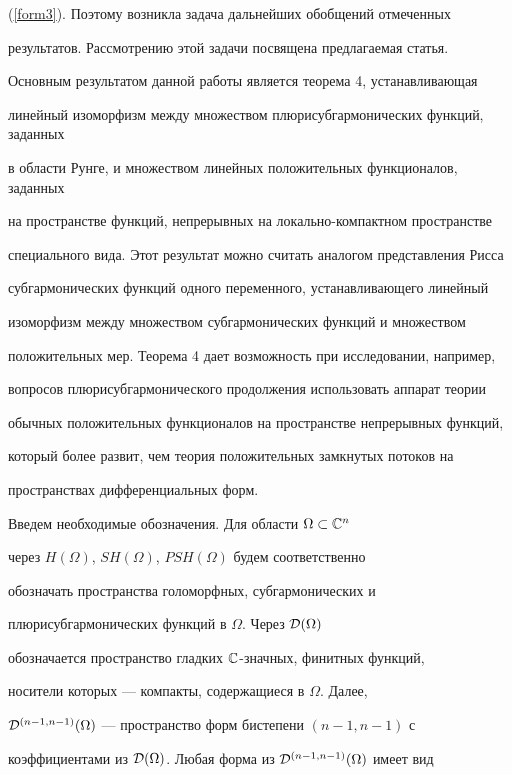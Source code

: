 (\ref{form3}). Поэтому возникла задача дальнейших обобщений отмеченных


результатов. Рассмотрению этой задачи посвящена предлагаемая статья. 


Основным результатом данной работы является теорема 4, устанавливающая 


линейный изоморфизм меж\-ду множеством плюрисубгармонических функций, заданных 


в области Рунге, и множеством линейных положительных функционалов, заданных 


на пространстве функций, непрерывных на локально-компактном пространстве 


специального вида. Этот результат можно считать аналогом представления Рисса 


субгармонических функций одного переменного, устанавливающего линейный 


изоморфизм между множеством субгармонических функций и множеством 


положительных мер. Теорема 4 дает возможность при исследовании, например, 


вопросов плюрисубгармонического продолжения использовать аппарат теории 


обычных положительных функционалов на пространстве непрерывных функций, 


который более развит, чем теория положительных замкнутых потоков на 


пространствах дифференциальных форм. 





Введем необходимые обозначения. Для области $\Omega\subset \Bbb C^n$ 


через $H(\Omega)$, $SH(\Omega)$, $PSH(\Omega)$ будем соответственно 


обозначать пространства голоморфных, субгармонических и 


плюрисубгармонических функций в $\Omega$. Через ${\cal D}(\Omega)$


обозначается пространство гладких $\Bbb C$-значных, финитных функций, 


носители которых --- компакты, содержащиеся в $\Omega$. Далее,


${\cal D}^{(n-1,n-1)}(\Omega)$ --- пространство форм бистепени $(n-1,n-1)$ с 


коэффициентами из ${\cal D}(\Omega)$. Любая форма из ${\cal 


D}^{(n-1,n-1)}(\Omega)$ имеет вид 


